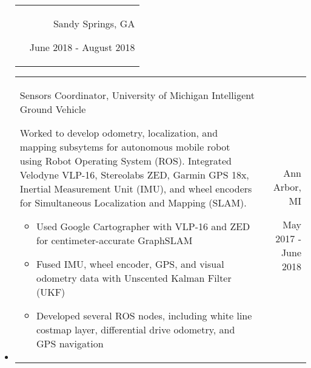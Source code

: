 \documentclass[9pt]{memoir}
\begin{document}
\begin{itemize}
\begin{tabular}[t]{lr}
\begin{minipage}[t]{0.7 \textwidth}
\end{minipage}

&

\begin{minipage}[t]{0.2 \textwidth}
\raggedleft

\normalsize
Sandy Springs, GA

\small
June 2018 - August 2018
\end{minipage}

\\

\end{tabular}

\item

\begin{tabular}[t]{lr}

\begin{minipage}[t]{0.7 \textwidth}
\raggedright

\normalsize
Sensors Coordinator, University of Michigan Intelligent Ground Vehicle

\small

Worked to develop odometry, localization, and mapping subsytems for autonomous mobile robot
using Robot Operating System (ROS). Integrated Velodyne VLP-16, Stereolabs ZED, Garmin GPS 18x,
Inertial Measurement Unit (IMU), and wheel encoders for Simultaneous Localization and Mapping (SLAM).

\begin{itemize}
\item Used Google Cartographer with VLP-16 and ZED for centimeter-accurate GraphSLAM
\item Fused IMU, wheel encoder, GPS, and visual odometry data with Unscented Kalman Filter (UKF)
\item Developed several ROS nodes, including white line costmap layer, differential drive odometry, and GPS navigation
\end{itemize}

\end{minipage}

&

\begin{minipage}[t]{0.2 \textwidth}
\raggedleft

\normalsize
Ann Arbor, MI

\small
May 2017 - June 2018
\end{minipage}

\\

\end{tabular}
\end{itemize}
\end{document}
